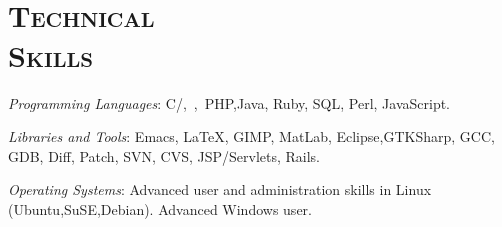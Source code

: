 \begin{resume}



 \begin{formatb}
   \\
   \body\\
 \end{formatb}



\section{\textsc{Technical\\ Skills}}

\emph{Programming Languages}: C/\Cplusplus,\ \CSharp,\ PHP,Java, Ruby, SQL, Perl, JavaScript.

\emph{Libraries and Tools}: Emacs, \LaTeX, GIMP, MatLab, Eclipse,GTKSharp, GCC, GDB, Diff, Patch, SVN, CVS, JSP/Servlets, Rails.

\emph{Operating Systems}: Advanced user and administration skills in Linux (Ubuntu,SuSE,Debian). Advanced Windows user.


\end{resume}
